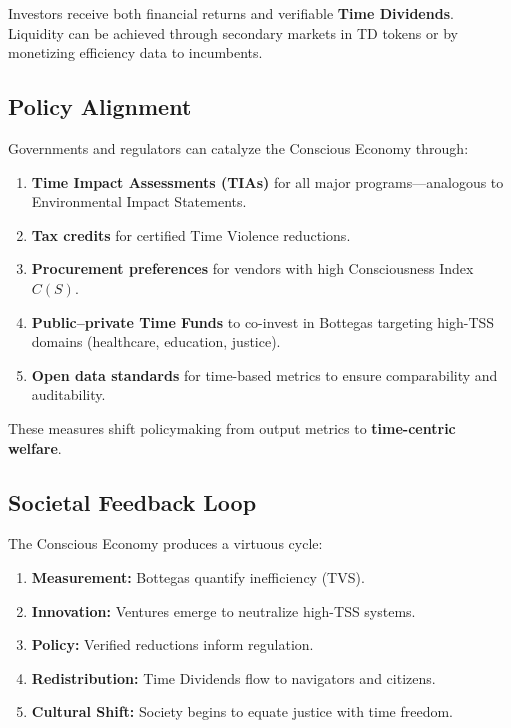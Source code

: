 Investors receive both financial returns and verifiable \textbf{Time Dividends}. Liquidity can be achieved through secondary markets in TD tokens or by monetizing efficiency data to incumbents.

\subsection{Policy Alignment}
\label{sec:policy-alignment}

Governments and regulators can catalyze the Conscious Economy through:

\begin{enumerate}
    \item \textbf{Time Impact Assessments (TIAs)} for all major programs—analogous to Environmental Impact Statements.
    \item \textbf{Tax credits} for certified Time Violence reductions.
    \item \textbf{Procurement preferences} for vendors with high Consciousness Index $C(S)$.
    \item \textbf{Public–private Time Funds} to co-invest in Bottegas targeting high-TSS domains (healthcare, education, justice).
    \item \textbf{Open data standards} for time-based metrics to ensure comparability and auditability.
\end{enumerate}

These measures shift policymaking from output metrics to \textbf{time-centric welfare}.

\subsection{Societal Feedback Loop}
\label{sec:feedback-loop}

The Conscious Economy produces a virtuous cycle:

\begin{enumerate}
    \item \textbf{Measurement:} Bottegas quantify inefficiency (TVS).
    \item \textbf{Innovation:} Ventures emerge to neutralize high-TSS systems.
    \item \textbf{Policy:} Verified reductions inform regulation.
    \item \textbf{Redistribution:} Time Dividends flow to navigators and citizens.
    \item \textbf{Cultural Shift:} Society begins to equate justice with time freedom.
\end{enumerate}

